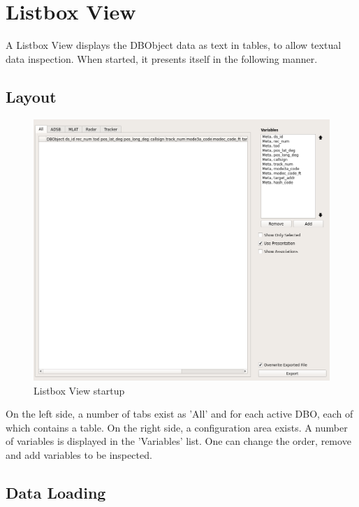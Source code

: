 \chapter{Listbox View}
\label{sec:listbox_view}
A Listbox View displays the DBObject data as text in tables, to allow textual data inspection. When started, it presents itself in the following manner.

\section{Layout}

\begin{figure}[H]
    \hspace*{-2cm}
    \includegraphics[width=18cm,frame]{../screenshots/listbox_start.png}
  \caption{Listbox View startup}
  \label{fig:listbox_start}
\end{figure}

On the left side, a number of tabs exist as 'All' and for each active DBO, each of which contains a table. On the right side, a configuration area exists. A number of variables is displayed in the 'Variables' list. One can change the order, remove and add variables to be inspected. \\

\section{Data Loading}

